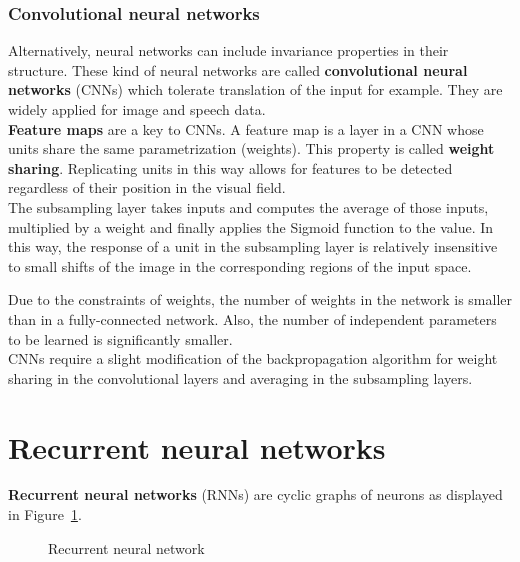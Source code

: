 \documentclass{report}
\begin{document}
\subsubsection{Convolutional neural networks}
Alternatively, neural networks can include invariance properties in their structure.
These kind of neural networks are called {\bf convolutional neural networks} (CNNs) which tolerate translation of the input for example.
They are widely applied for image and speech data. \\
{\bf Feature maps} are a key to CNNs. A feature map is a layer in a CNN whose units share the same parametrization (weights). This property is called {\bf weight sharing}.
Replicating units in this way allows for features to be detected regardless of their position in the visual field.\\
The subsampling layer takes inputs and computes the average of those inputs, multiplied by a weight and finally applies the Sigmoid function to the value.
In this way, the response of a unit in the subsampling layer is relatively insensitive to small shifts of the image in the corresponding regions of the input space.


Due to the constraints of weights, the number of weights in the network is smaller than in a fully-connected network.
Also, the number of independent parameters to be learned is significantly smaller. \\
CNNs require a slight modification of the backpropagation algorithm for weight sharing in the convolutional layers and averaging in the subsampling layers.

\section{Recurrent neural networks}
{\bf Recurrent neural networks} (RNNs) are cyclic graphs of neurons as displayed in Figure~\ref{figure:recurrentneuralnetwork}.

\begin{figure}[h!]
\centering
{}
\caption{Recurrent neural network}
\label{figure:recurrentneuralnetwork}
\end{figure}
\end{document}
